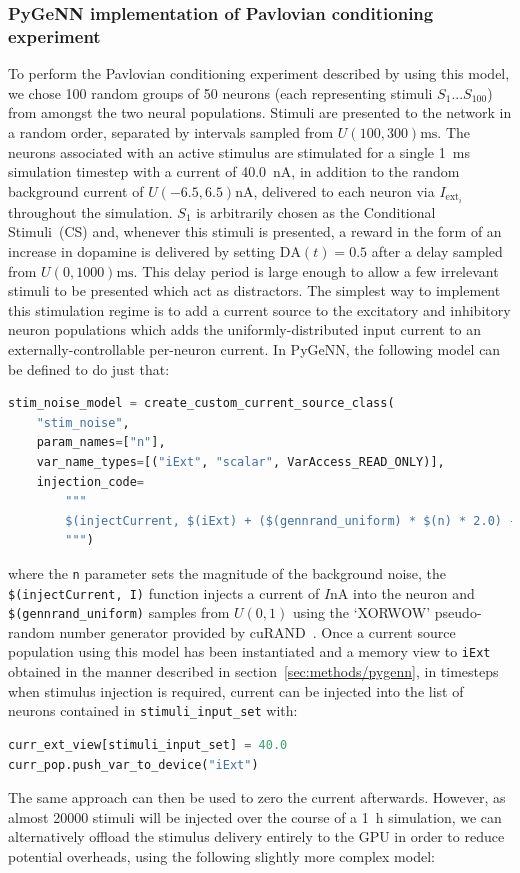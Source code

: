 \documentclass[utf8]{frontiersSCNS} %
\begin{document}
\subsubsection{PyGeNN implementation of Pavlovian conditioning experiment}
To perform the Pavlovian conditioning experiment described by \citet{Izhikevich2007} using this model, we chose \num{100} random groups of \num{50} neurons (each representing stimuli $S_{1}$...$S_{100}$) from amongst the two neural populations.
Stimuli are presented to the network in a random order, separated by intervals sampled from $U(100, 300) \si{\milli\second}$.
The neurons associated with an active stimulus are stimulated for a single \SI{1}{\milli\second} simulation timestep with a current of \SI{40.0}{\nano\ampere}, in addition to the random background current of $U(-6.5,6.5) \si{\nano\ampere}$, delivered to each neuron via $I_{\text{ext}_{i}}$ throughout the simulation.
$S_{1}$ is arbitrarily chosen as the Conditional Stimuli~(CS) and, whenever this stimuli is presented, a reward in the form of an increase in dopamine is delivered by setting $\text{DA}(t)=0.5$ after a delay sampled from $U(0, 1000) \si{\milli\second}$.
This delay period is large enough to allow a few irrelevant stimuli to be presented which act as distractors.
The simplest way to implement this stimulation regime is to add a current source to the excitatory and inhibitory neuron populations which adds the uniformly-distributed input current to an externally-controllable per-neuron current.
In PyGeNN, the following model can be defined to do just that:
\begin{lstlisting}[language=python]
stim_noise_model = create_custom_current_source_class(
    "stim_noise",
    param_names=["n"],
    var_name_types=[("iExt", "scalar", VarAccess_READ_ONLY)],
    injection_code=
        """
        $(injectCurrent, $(iExt) + ($(gennrand_uniform) * $(n) * 2.0) - $(n));
        """)
\end{lstlisting}

where the \lstinline{n} parameter sets the magnitude of the background noise, the \lstinline{$(injectCurrent, I)} function injects a current of $I\si{\nano\ampere}$ into the neuron and \lstinline{$(gennrand_uniform)} samples from $U(0,1)$ using the `XORWOW' pseudo-random number generator provided by cuRAND~\citep{NVIDIACorporation2019}. 
Once a current source population using this model has been instantiated and a memory view to \lstinline{iExt} obtained in the manner described in section~\ref{sec:methods/pygenn}, in timesteps when stimulus injection is required, current can be injected into the list of neurons contained in \lstinline{stimuli_input_set} with:
\begin{lstlisting}[language=python]
curr_ext_view[stimuli_input_set] = 40.0
curr_pop.push_var_to_device("iExt")
\end{lstlisting}
The same approach can then be used to zero the current afterwards.
However, as almost \num{20000} stimuli will be injected over the course of a \SI{1}{\hour} simulation, we can alternatively offload the stimulus delivery entirely to the GPU in order to reduce potential overheads, using the following slightly more complex model:
\end{document}
